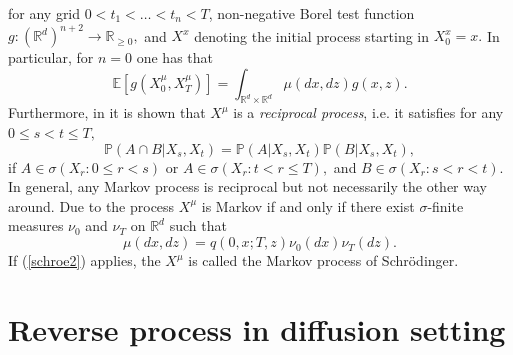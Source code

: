 \documentclass[a4paper,11pt]{amsart}
\theoremstyle{plain}
\theoremstyle{remark}
\begin{document}
for any grid $0<t_{1}<\ldots<t_{n}<T$, non-negative Borel test function
$g:\left(  \mathbb{R}^{d}\right)  ^{n+2}\rightarrow\mathbb{R}_{\geq0},$ and
$X^{x}$ denoting the initial process starting in $X_{0}^{x}=x.$ In particular,
for $n=0$ one has that%
\begin{equation}
\mathbb{E}\left[  g(X_{0}^{\mu},X_{T}^{\mu})\right]  =\int_{\mathbb{R}%
^{d}\times\mathbb{R}^{d}}\mu(dx,dz)g(x,z). \label{endpdis}%
\end{equation}
Furthermore, in \cite{Jam74} it is shown that $X^{\mu}$ is a
\textit{reciprocal process}, i.e. it satisfies for any $0\leq s<t\leq T,$%
\[
\mathbb{P}\left(  A\cap B|X_{s},X_{t}\right)  =\mathbb{P}\left(  A|X_{s}%
,X_{t}\right)  \mathbb{P}\left(  B|X_{s},X_{t}\right)  ,
\]
if $A\in\sigma\left(  X_{r}:0\leq r<s\right)  $ or $A\in\sigma\left(
X_{r}:t<r\leq T\right)  ,$ and $B\in\sigma\left(  X_{r}:s<r<t\right)  .$ In
general, any Markov process is reciprocal but not necessarily the other way
around. Due to \cite{Jam74} the process $X^{\mu}$ is Markov if and only if
there exist $\sigma$-finite measures $\nu_{0}$ and $\nu_{T}$ on $\mathbb{R}%
^{d}$ such that
\begin{equation}
\mu\left(  dx,dz\right)  =q(0,x;T,z)\nu_{0}(dx)\nu_{T}(dz). \label{schroe2}%
\end{equation}
If (\ref{schroe2}) applies, the $X^{\mu}$ is called the Markov process of Schr\"{o}dinger.


\section{Reverse process in diffusion setting}

\label{subsec:reverse_diffusion_construction}
\end{document}
